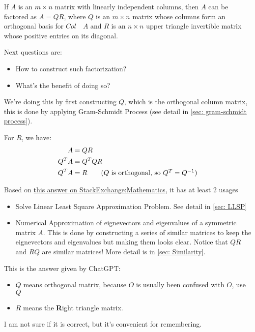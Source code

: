 \begin{definition}[QR factorization]
    If \(A\) is an \(m \times n\) matrix with linearly independent columns, then \(A\) can be factored as \(A = QR\), 
    where \(Q\) is an \(m \times n\) matrix whose columns form an orthogonal basis for \(Col \quad A\) and \(R\) is an \(n \times n\) upper triangle invertible matrix whose positive entries on its diagonal.      
\end{definition}

Next questions are:
\begin{itemize}
    \item How to construct such factorization?
    \item What's the benefit of doing so?
\end{itemize}

We're doing this by first constructing \(Q\), which is the orthogonal column matrix, this is done by applying Gram-Schmidt Process (see detail in \ref{sec: gram-schmidt process}).

For \(R\), we have:
\begin{align*}
    A &= QR \\
    Q^T A &= Q^T Q R \\
    Q^T A &= R  \tag{\(Q\) is orthogonal, so \(Q^T = Q^{-1}\)}
\end{align*}

\begin{remark}
    Based on \href{https://math.stackexchange.com/a/198484}{this answer on StackExchange:Mathematics}, it has at least 2 usages

    \begin{itemize}
        \item Solve Linear Least Square Approximation Problem. See detail in \ref{sec: LLSP}
        \item Numerical Approximation of eignevectors and eigenvalues of a symmetric matrix \(A\). 
        This is done by constructing a series of similar matrices to keep the eignevectors and eigenvalues but making them looks clear.  
        Notice that \(QR\) and \(RQ\) are similar matrices!  
        More detail is in \ref{sec: Similarity}.
    \end{itemize}
\end{remark}


\begin{note}
    This is the answer given by ChatGPT:
    \begin{itemize}
        \item \(Q\)  means orthogonal matrix, because \(O\) is usually been confused with \(O\), use \(Q\)   
        \item \(R\) means the \textbf{R}ight triangle matrix. 
    \end{itemize}    

    I am not sure if it is correct, but it's convenient for remembering.
\end{note}

